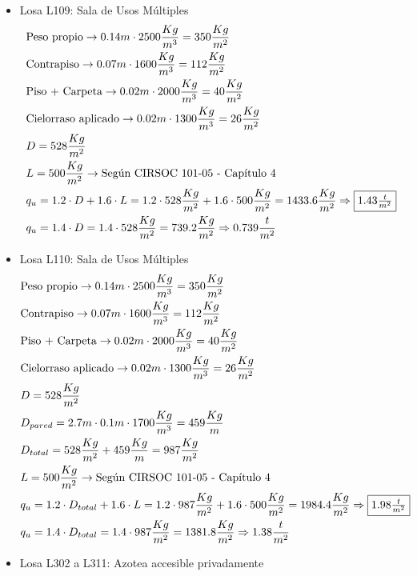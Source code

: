 \begin{enumerate}
\begin{itemize}
\item Losa L109: Sala de Usos Múltiples
\begin{align*}
& \text{Peso propio} \rightarrow 0.14m \cdot 2500 \frac{Kg}{m^3} = 350 \frac{Kg}{m^2}\\
& \text{Contrapiso} \rightarrow 0.07m \cdot 1600 \frac{Kg}{m^3} = 112 \frac{Kg}{m^2}\\
& \text{Piso + Carpeta} \rightarrow 0.02m \cdot 2000 \frac{Kg}{m^3} = 40 \frac{Kg}{m^2}\\
& \text{Cielorraso aplicado} \rightarrow  0.02m \cdot 1300 \frac{Kg}{m^3} = 26 \frac{Kg}{m^2}\\
& D = 528 \frac{Kg}{m^2}\\
& L = 500 \frac{Kg}{m^2} \rightarrow \text{Según CIRSOC 101-05 - Capítulo 4}\\
& q_u = 1.2 \cdot D + 1.6 \cdot L = 1.2 \cdot 528 \frac{Kg}{m^2} + 1.6 \cdot 500 \frac{Kg}{m^2} = 1433.6 \frac{Kg}{m^2} \Rightarrow \framebox{$1.43 \frac{t}{m^2}$} \\
& q_u = 1.4 \cdot D = 1.4 \cdot 528 \frac{Kg}{m^2} = 739.2 \frac{Kg}{m^2} \Rightarrow 0.739 \frac{t}{m^2}
\end{align*}

\item Losa L110: Sala de Usos Múltiples
\begin{align*}
& \text{Peso propio} \rightarrow 0.14m \cdot 2500 \frac{Kg}{m^3} = 350 \frac{Kg}{m^2}\\
& \text{Contrapiso} \rightarrow 0.07m \cdot 1600 \frac{Kg}{m^3} = 112 \frac{Kg}{m^2}\\
& \text{Piso + Carpeta} \rightarrow 0.02m \cdot 2000 \frac{Kg}{m^3} = 40 \frac{Kg}{m^2}\\
& \text{Cielorraso aplicado} \rightarrow  0.02m \cdot 1300 \frac{Kg}{m^3} = 26 \frac{Kg}{m^2}\\
& D = 528 \frac{Kg}{m^2}\\
& D_{pared} = 2.7m \cdot 0.1m \cdot 1700\frac{Kg}{m^3} = 459 \frac{Kg}{m} \\
& D_{total} = 528 \frac{Kg}{m^2} + 459 \frac{Kg}{m} = 987 \frac{Kg}{m^2}\\
& L = 500 \frac{Kg}{m^2} \rightarrow \text{Según CIRSOC 101-05 - Capítulo 4}\\
& q_u = 1.2 \cdot D_{total} + 1.6 \cdot L = 1.2 \cdot 987 \frac{Kg}{m^2} + 1.6 \cdot 500 \frac{Kg}{m^2} = 1984.4 \frac{Kg}{m^2} \Rightarrow \framebox{$1.98 \frac{t}{m^2}$} \\
& q_u = 1.4 \cdot D_{total} = 1.4 \cdot 987 \frac{Kg}{m^2} = 1381.8 \frac{Kg}{m^2} \Rightarrow 1.38 \frac{t}{m^2}
\end{align*}
\newpage
\item Losa L302 a L311: Azotea accesible privadamente


\end{itemize}
\end{enumerate}
